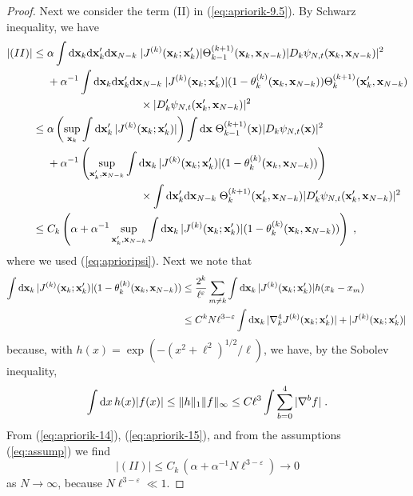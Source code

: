 \documentclass[11pt]{article}
\newcommand{\rd}{{\rm d}}
\newcommand{\eps}{\varepsilon}
\newcommand{\bx}{{\bf x}}
\renewcommand{\a}{\alpha}
\begin{document}
\begin{proof}
Next we consider the term (II) in
(\ref{eq:apriorik-9.5}). By  Schwarz inequality, we have
\begin{equation}\label{eq:apriorik-14}
\begin{split}
|(II)|\leq \; & \a \int \rd \bx_k \rd \bx'_k \rd \bx_{N-k} \;
|J^{(k)} (\bx_k; \bx'_k)| \Theta_{k-1}^{(k+1)} (\bx_k, \bx_{N-k})
|D_k \psi_{N,t} (\bx_k, \bx_{N-k})|^2 \\ &+ \a^{-1} \int \rd \bx_k
\rd \bx'_k \rd \bx_{N-k} \; |J^{(k)} (\bx_k; \bx'_k)|
(1-\theta_k^{(k)}
(\bx_k, \bx_{N-k})) \Theta_{k}^{(k+1)} (\bx'_k, \bx_{N-k}) \\
&\hspace{3cm} \times |D'_k
 \psi_{N,t} (\bx'_k, \bx_{N-k})|^2 \\
\leq \; & \a \left(\sup_{\bx_k} \int \rd \bx'_k \, |J^{(k)} (\bx_k;
\bx'_k)| \right) \int \rd \bx \; \Theta_{k-1}^{(k+1)} (\bx) |D_k
\psi_{N,t} (\bx)|^2 \\ &+ \a^{-1} \left( \sup_{\bx'_k, \bx_{N-k}}
\int \rd \bx_k \, |J^{(k)} (\bx_k; \bx'_k)| (1-\theta_k^{(k)}
(\bx_k, \bx_{N-k})) \right) \\ &\hspace{3cm} \times  \int \rd \bx'_k
\rd \bx_{N-k} \; \Theta_{k}^{(k+1)} (\bx'_k, \bx_{N-k}) |D'_k
\psi_{N,t} (\bx'_k, \bx_{N-k})|^2 \\ \leq \; & C_k \left( \a +
\a^{-1}\sup_{\bx'_k, \bx_{N-k}} \int \rd \bx_k \, |J^{(k)} (\bx_k;
\bx'_k)| (1-\theta_k^{(k)} (\bx_k, \bx_{N-k})) \right) \; ,
\end{split}
\end{equation}
where we used (\ref{eq:aprioripsi}). Next we note that
\begin{equation}\label{eq:apriorik-15}
\begin{split}
\int \rd \bx_k \, |J^{(k)} (\bx_k; \bx'_k)| (1-\theta_k^{(k)}
(\bx_k, \bx_{N-k})) &\leq \frac{2^k}{\ell^{\eps}} \sum_{m \neq k}
\int \rd \bx_k \, |J^{(k)} (\bx_k; \bx'_k)| h (x_k -x_m) \\ & \leq
C^k N \ell^{3-\eps} \int \rd \bx_k \, |\nabla^4_k J^{(k)} (\bx_k ;
\bx'_k)| + |J^{(k)} (\bx_k;\bx'_k)| \,
\end{split}
\end{equation}
because, with $h(x) = \exp (- (x^2 + \ell^2)^{1/2}/\ell)$, we have, by the
Sobolev inequality,
\begin{equation}
\int \rd x \, h (x) |f(x)| \leq \| h\|_1 \| f\|_\infty
\leq C \ell^{3} \int \sum_{b=0}^4 |\nabla^b f| \;.
\end{equation}
{F}rom (\ref{eq:apriorik-14}), (\ref{eq:apriorik-15}), and from the
assumptions (\ref{eq:assump}) we find
\begin{equation}
|(II)| \leq C_k \, \left( \a + \a^{-1} N\ell^{3-\eps} \right) \to 0
\end{equation}
as $N \to \infty$, because $N\ell^{3-\eps}  \ll 1$.


\end{proof}
\end{document}
